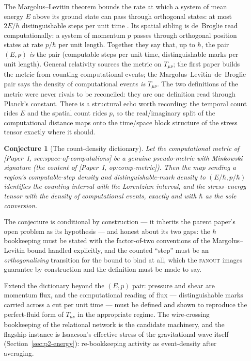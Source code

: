 \documentclass[11pt,a4paper]{article}
\newtheorem{conjecture}{Conjecture}
\newcommand{\Pone}[1]{[Paper~I, #1]} %
\newcommand{\fanout}{\textsc{fanout}}
\begin{document}
The Margolus--Levitin theorem bounds the rate at which a system of mean energy $E$ above its
ground state can pass through orthogonal states: at most $2E/h$ distinguishable steps per unit
time \autocite{margoluslevitin1998}. Its spatial sibling is de~Broglie read computationally: a
system of momentum $p$ passes through orthogonal position states at rate $p/\hbar$ per unit
length. Together they say that, up to $\hbar$, the pair $(E, p)$ \emph{is} the pair (computable
steps per unit time, distinguishable marks per unit length). General relativity sources the metric
on $T_{\mu\nu}$; the first paper builds the metric from counting computational events; the
Margolus--Levitin--de~Broglie pair says the density of computational events \emph{is}
$T_{\mu\nu}$. The two definitions of the metric were never rivals to be reconciled: they are one
definition read through Planck's constant. There is a structural echo worth recording: the
temporal count rides $E$ and the spatial count rides $p$, so the real/imaginary split of the
computational distance maps onto the time/space block structure of the stress tensor exactly where
it should.

\begin{conjecture}[The count-density dictionary]\label{conj:dictionary}
Let the computational metric of \Pone{sec:space-of-computations} be a genuine pseudo-metric with
Minkowski signature (the content of \Pone{op:comp-metric}). Then the map sending a region's
computable-step density and distinguishable-mark density to $(E/\hbar, p/\hbar)$ identifies the
counting interval with the Lorentzian interval, and the stress--energy tensor with the density of
computational events, exactly and with $\hbar$ as the sole conversion.
\end{conjecture}

The conjecture is conditional by construction --- it inherits the parent paper's open problem as
its hypothesis --- and honest about its two gaps: the $\hbar$ bookkeeping must be stated with the
factor-of-two conventions of the Margolus--Levitin bound handled explicitly, and the counted
``step'' must be an \emph{orthogonalising} transition for the bound to bind at all, which the
\fanout{} images guarantee by construction and the definition must be made to say.

\begin{openproblem}\label{op:p2-pressure}
Extend the dictionary beyond the $(E, p)$ pair: pressure and shear are momentum flux, and the
computational reading of flux --- distinguishable marks carried across a cut per unit time ---
must be defined and shown to reproduce the perfect-fluid form of $T_{\mu\nu}$ in the appropriate
regime. The wire-crossing bookkeeping of the relational network is the candidate machinery, and the
flagship instance is Isaacson's effective stress of the gravitational wave itself
(Section~\ref{sec:p2-energy}): re-bookkeeping activity as event-density after averaging.
\end{openproblem}
\end{document}
